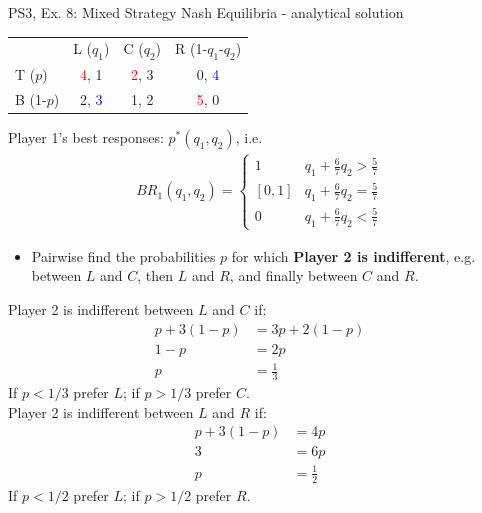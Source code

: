 \begin{frame}{PS3, Ex. 8: Mixed Strategy Nash Equilibria - analytical solution}
  \begin{multicols}{2}
    \begin{table}
      \begin{tabular}{l|c|c|c|}
          \multicolumn{1}{c}{}  & \multicolumn{1}{c}{L ($q_1$)} & \multicolumn{1}{c}{C ($q_2$)} & \multicolumn{1}{c}{R (1-$q_1$-$q_2$)} \\\cline{2-4}
          T ($p$)   & \textcolor{red}{4}, 1 & \textcolor{red}{2}, 3 & 0, \textcolor{blue}{4} \\\cline{2-4}
          B (1-$p$) & 2, \textcolor{blue}{3} & 1, 2 & \textcolor{red}{5}, 0 \\\cline{2-4}
      \end{tabular}
    \end{table}
    Player 1's best responses: $p^{*}(q_1,q_2)$, i.e.
    \begin{align*}
      BR_1(q_1,q_2)=
      \left\{ \begin{array}{ll}
          1                 & q_1 + \frac{6}{7}q_2 > \frac{5}{7}\\
          \left[0,1\right]  & q_1 + \frac{6}{7}q_2 = \frac{5}{7}\\
          0                 & q_1 + \frac{6}{7}q_2 < \frac{5}{7}
      \end{array}\right.
    \end{align*}
    \begin{itemize}
      \item[4.] Pairwise find the probabilities $p$ for which \textbf{Player 2 is indifferent}, e.g. between $L$ and $C$, then $L$ and $R$, and finally between $C$ and $R$.
    \end{itemize}
  \vfill\null \columnbreak
    Player 2 is indifferent between $L$ and $C$ if:
    \begin{align*}
      p+3(1-p)&= 3p + 2(1-p) \\
      1-p     &= 2p \\
      p       &= \frac{1}{3}
    \end{align*}
    If $p<1/3$ prefer $L$; if $p>1/3$ prefer $C$.\\\medskip
    Player 2 is indifferent between $L$ and $R$ if:
    \begin{align*}
      p+3(1-p)&= 4p \\
      3       &= 6p \\
      p       &= \frac{1}{2}
    \end{align*}
    If $p<1/2$ prefer $L$; if $p>1/2$ prefer $R$.\\\medskip
  \vfill\null
  \end{multicols}
\end{frame}
